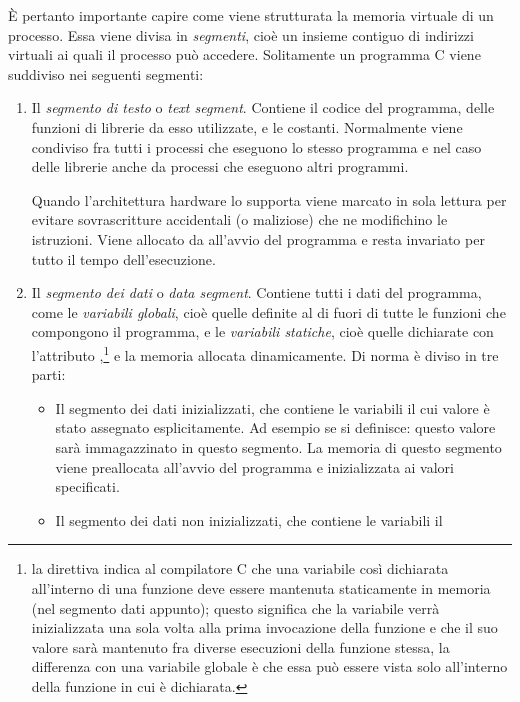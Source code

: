 È pertanto importante capire come viene strutturata la memoria virtuale di un
processo. Essa viene divisa in \textsl{segmenti}, cioè un insieme contiguo di
indirizzi virtuali ai quali il processo può accedere.  Solitamente un
programma C viene suddiviso nei seguenti segmenti:
\begin{enumerate}
\item Il \textsl{segmento di testo} o \textit{text segment}.  Contiene il
  codice del programma, delle funzioni di librerie da esso utilizzate, e le
  costanti.  Normalmente viene condiviso fra tutti i processi che eseguono lo
  stesso programma e nel caso delle librerie anche da processi che eseguono
  altri programmi.

  Quando l'architettura hardware lo supporta viene marcato in sola lettura per
  evitare sovrascritture accidentali (o maliziose) che ne modifichino le
  istruzioni.  Viene allocato da  all'avvio del programma e resta
  invariato per tutto il tempo dell'esecuzione.
\item Il \textsl{segmento dei dati} o \textit{data segment}. Contiene tutti i
  dati del programma, come le \textsl{variabili globali}, cioè quelle definite
  al di fuori di tutte le funzioni che compongono il programma, e le
  \textsl{variabili statiche}, cioè quelle dichiarate con l'attributo
  ,\footnote{la direttiva  indica al compilatore
    C che una variabile così dichiarata all'interno di una funzione deve
    essere mantenuta staticamente in memoria (nel segmento dati appunto);
    questo significa che la variabile verrà inizializzata una sola volta alla
    prima invocazione della funzione e che il suo valore sarà mantenuto fra
    diverse esecuzioni della funzione stessa, la differenza con una variabile
    globale è che essa può essere vista solo all'interno della funzione in cui
    è dichiarata.} e la memoria allocata dinamicamente. Di norma è diviso in
  tre parti:
  \begin{itemize}
  \item Il segmento dei dati inizializzati, che contiene le variabili il cui
    valore è stato assegnato esplicitamente. Ad esempio se si definisce:
    questo valore sarà immagazzinato in questo segmento. La memoria di questo
    segmento viene preallocata all'avvio del programma e inizializzata ai valori
    specificati.
  \item Il segmento dei dati non inizializzati, che contiene le variabili il

\end{itemize}
\end{enumerate}
